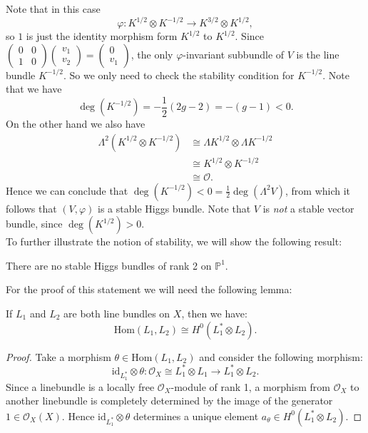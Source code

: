 	Note that in this case 
	\[
	\varphi: K^{1/2} \otimes K^{-1/2} \longrightarrow K^{3/2}\otimes K^{1/2},
	\]
	so $1$ is just the identity morphism form $K^{1/2}$ to $K^{1/2}$. Since $\begin{pmatrix}0&0\\1&0\end{pmatrix}\begin{pmatrix}v_1\\v_2\end{pmatrix}=\begin{pmatrix}0\\v_1\end{pmatrix}$, the only $\varphi$-invariant subbundle of $V$ is the line bundle $K^{-1/2}$. So we only need to check the stability condition for $K^{-1/2}$. Note that we have
	\[
	\deg(K^{-1/2}) = -\frac 12(2g-2) = -(g-1)<0.
	\]
	On the other hand we also have 
	\begin{align*}
		\Lambda^2(K^{1/2}\otimes K^{-1/2}) &\cong \Lambda K^{1/2} \otimes \Lambda K^{-1/2} \\
		&\cong K^{1/2}\otimes K^{-1/2}\\
		&\cong \mathcal{O}.
	\end{align*}
	Hence we can conclude that $\deg(K^{-1/2})<0 = \frac 12 \deg(\Lambda^2V)$, from which it follows that $(V,\varphi)$ is a stable Higgs bundle. Note that $V$ is \textit{not} a stable vector bundle, since $\deg(K^{1/2})>0$.
	\\
	 
To further illustrate the notion of stability, we will show the following result: 

\begin{lemma}\label{nostableonP1}
	There are no stable Higgs bundles of rank 2 on $\mathbb{P}^1$. 
\end{lemma}

For the proof of this statement we will need the following lemma: 
\begin{lemma}\label{lem:Hom(L1,L2)}
	If $L_1$ and $L_2$ are both line bundles on $X$, then we have: 
	\[
	\mathrm{Hom} ( L_1 , L_2 ) \cong H^0 ( L_1 ^* \otimes L_2 ).
	\]
\end{lemma}

\begin{proof}
	Take a morphism $\theta \in \mathrm{Hom}(L_1,L_2)$ and consider the following morphism: 
	\[
	\mathrm{id}_{L_1^*} \otimes \theta  : \mathcal{O}_X \cong L_1^* \otimes L_1 \longrightarrow L_1^* \otimes L_2.
	\]
	Since a linebundle is a locally free $\mathcal{O}_X$-module of rank 1, a morphism from $\mathcal{O}_X$ to another linebundle is completely determined by the image of the generator $1 \in \mathcal{O}_X(X)$. Hence $\mathrm{id}_{L_1^*} \otimes \theta$ determines a unique element $a_{\theta} \in H^0(L_1^*\otimes L_2)$.
\end{proof}

